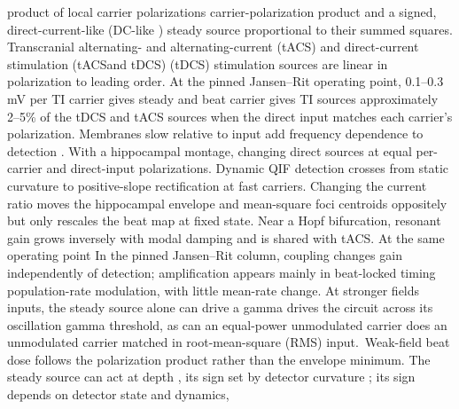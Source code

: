 \documentclass[11pt,a4paper]{article}
\providecommand{\DIFaddtex}[1]{{\protect\color{blue} \sf #1}} %
\providecommand{\DIFdeltex}[1]{{\protect\color{red} \scriptsize #1}} %
\providecommand{\DIFaddbegin}{} %
\providecommand{\DIFaddend}{} %
\providecommand{\DIFdelbegin}{} %
\providecommand{\DIFdelend}{} %
\providecommand{\DIFadd}[1]{\texorpdfstring{\DIFaddtex{#1}}{#1}} %
\providecommand{\DIFdel}[1]{\texorpdfstring{\DIFdeltex{#1}}{}} %
\begin{document}
\DIFdelbegin \DIFdel{product of
local carrier polarizations }\DIFdelend \DIFaddbegin \DIFadd{carrier-polarization product }\DIFaddend and a signed, \DIFaddbegin \DIFadd{direct-current-like (}\DIFaddend DC-like\DIFaddbegin \DIFadd{) }\DIFaddend steady source
proportional to their summed squares. Transcranial \DIFdelbegin \DIFdel{alternating- and }\DIFdelend \DIFaddbegin \DIFadd{alternating-current (tACS) and }\DIFaddend direct-current \DIFdelbegin \DIFdel{stimulation (tACSand tDCS)
}\DIFdelend \DIFaddbegin \DIFadd{(tDCS)
stimulation }\DIFaddend sources are linear \DIFdelbegin \DIFdel{in polarization }\DIFdelend to leading order. At the pinned
Jansen--Rit operating point, 0.1--0.3 mV per \DIFdelbegin \DIFdel{TI carrier gives steady and beat }\DIFdelend \DIFaddbegin \DIFadd{carrier gives TI }\DIFaddend sources approximately
2--5\% of \DIFdelbegin \DIFdel{the tDCS and tACS sources when the direct input matches each carrier's polarization. Membranes slow relative to input add frequency dependence to detection . With a
hippocampal montage, changing }\DIFdelend \DIFaddbegin \DIFadd{direct sources at equal per-carrier and direct-input
polarizations. Dynamic QIF detection crosses from static curvature to positive-slope
rectification at fast carriers. Changing }\DIFaddend the current ratio moves \DIFaddbegin \DIFadd{the hippocampal
}\DIFaddend envelope and mean-square \DIFdelbegin \DIFdel{foci
}\DIFdelend \DIFaddbegin \DIFadd{centroids }\DIFaddend oppositely but only rescales the beat map at
fixed state. Near a Hopf bifurcation, resonant gain grows inversely with modal damping
and is shared with tACS. \DIFdelbegin \DIFdel{At the same
operating point}\DIFdelend \DIFaddbegin \DIFadd{In the pinned Jansen--Rit column}\DIFaddend , coupling changes gain
independently of detection; amplification appears mainly in beat-locked \DIFdelbegin \DIFdel{timing}\DIFdelend \DIFaddbegin \DIFadd{population-rate
modulation}\DIFaddend , with little mean-rate change. At stronger \DIFdelbegin \DIFdel{fields }\DIFdelend \DIFaddbegin \DIFadd{inputs, }\DIFaddend the steady source alone \DIFdelbegin \DIFdel{can drive a gamma }\DIFdelend \DIFaddbegin \DIFadd{drives the }\DIFaddend circuit across its \DIFdelbegin \DIFdel{oscillation }\DIFdelend \DIFaddbegin \DIFadd{gamma
}\DIFaddend threshold, as \DIFdelbegin \DIFdel{can
an equal-power unmodulated carrier }\DIFdelend \DIFaddbegin \DIFadd{does an unmodulated carrier matched in root-mean-square (RMS) input}\DIFaddend .\ Weak-field beat dose follows the polarization product rather than the envelope minimum.
The steady source can act at depth\DIFdelbegin \DIFdel{, its sign set by detector curvature}\DIFdelend \DIFaddbegin \DIFadd{; its sign depends on detector state and dynamics}\DIFaddend ,
\end{document}
